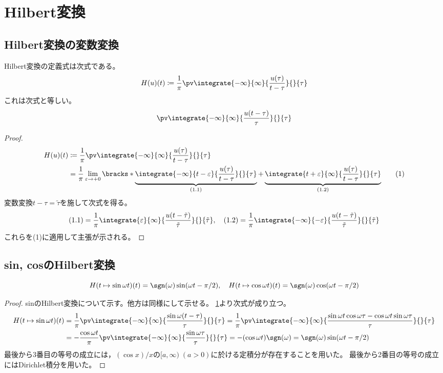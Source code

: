 \part{Hilbert変換}
    \chapter{Hilbert変換の変数変換}
        \label{Hilbert 変換の変数変換}
        \begin{shadebox}
            Hilbert変換の定義式は次式である。
            \[ H(u)(t)\coloneq\frac{1}{\pi}\pv\integrate{-\infty}{\infty}{\frac{u(\tau)}{t-\tau}}{}{\tau} \]
            これは次式と等しい。
            \[ \pv\integrate{-\infty}{\infty}{\frac{u(t-\tau)}{\tau}}{}{\tau} \]
        \end{shadebox}
        \begin{proof}
            \begin{align*}
                H(u)(t) &\coloneq\frac{1}{\pi}\pv\integrate{-\infty}{\infty}{\frac{u(\tau)}{t-\tau}}{}{\tau} \\
                &= \frac{1}{\pi}\lim_{\varepsilon\to +0}\bracks*{\underbrace{\integrate{-\infty}{t-\varepsilon}{\frac{u(\tau)}{t-\tau}}{}{\tau}}_{(1.1)} + \underbrace{\integrate{t+\varepsilon}{\infty}{\frac{u(\tau)}{t-\tau}}{}{\tau}}_{(1.2)}} \tag{1}
            \end{align*}
            変数変換$t-\tau = \tilde{\tau}$を施して次式を得る。
            \[ (1.1) = \frac{1}{\pi}\integrate{\varepsilon}{\infty}{\frac{u(t-\tilde{\tau})}{\tilde{\tau}}}{}{\tilde{\tau}},\quad (1.2) = \frac{1}{\pi}\integrate{-\infty}{-\varepsilon}{\frac{u(t-\tilde{\tau})}{\tilde{\tau}}}{}{\tilde{\tau}} \]
            これらを(1)に適用して主張が示される。
        \end{proof}
    \chapter{sin, cosのHilbert変換}
        \begin{shadebox}
            \[ H(t\mapsto\sin\omega t)(t) = \sgn(\omega)\sin(\omega t-\pi/2),\quad H(t\mapsto\cos\omega t)(t) = \sgn(\omega)\cos(\omega t-\pi/2) \]
        \end{shadebox}
        \begin{proof}
            sinのHilbert変換について示す。他方は同様にして示せる。
            \ref{Hilbert 変換の変数変換}より次式が成り立つ。
            \begin{align*}
                H(t\mapsto\sin\omega t)(t) &= \frac{1}{\pi}\pv\integrate{-\infty}{\infty}{\frac{\sin\omega(t-\tau)}{\tau}}{}{\tau} = \frac{1}{\pi}\pv\integrate{-\infty}{\infty}{\frac{\sin\omega t\cos\omega\tau - \cos\omega t\sin\omega\tau}{\tau}}{}{\tau} \\
                &= -\frac{\cos\omega t}{\pi}\pv\integrate{-\infty}{\infty}{\frac{\sin\omega\tau}{\tau}}{}{\tau} = -(\cos\omega t)\sgn(\omega) = \sgn(\omega)\sin(\omega t-\pi/2)
            \end{align*}
            最後から3番目の等号の成立には，$(\cos x)/x$の$[a,\infty)\;(a>0)$に於ける定積分が存在することを用いた。
            最後から2番目の等号の成立にはDirichlet積分を用いた。
        \end{proof}
